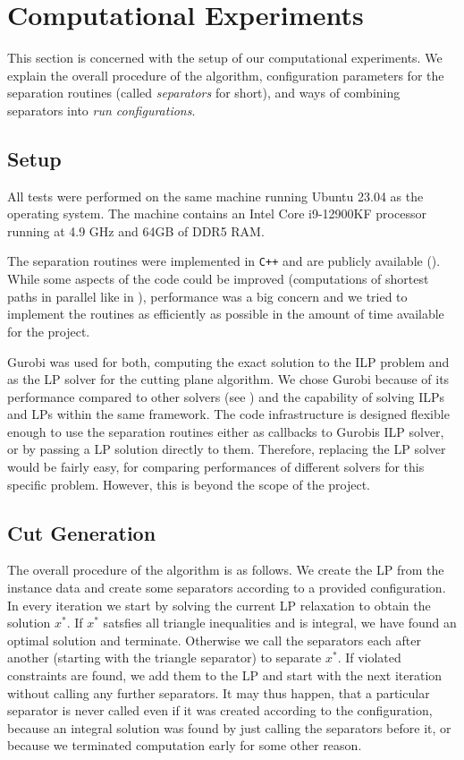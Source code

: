 \section{Computational Experiments}\label{sec:experiments}
This section is concerned with the setup of our computational experiments.
We explain the overall procedure of the algorithm, configuration parameters for the separation routines (called \textit{separators} for short), and ways of combining separators into \textit{run configurations}.

\subsection{Setup}\label{subsec:experiments_setup}
All tests were performed on the same machine running Ubuntu 23.04 as the operating system.
The machine contains an Intel Core i9-12900KF processor running at 4.9 GHz and 64GB of DDR5 RAM. 

The separation routines were implemented in \texttt{C++} and are publicly available (\cite{moellerCliqpart2023}).
While some aspects of the code could be improved (\eg computations of shortest paths in parallel like in \cite{sorensenSeparationHeuristic2Partition2020}),
performance was a big concern and we tried to implement the routines as efficiently as possible in the amount of time available for the project.

Gurobi \cite{gurobioptimizationllcGurobiOptimizerReference2023} was used for both, computing the exact solution to the ILP problem and as the LP solver for the cutting plane algorithm.
We chose Gurobi because of its performance compared to other solvers (see \cite{meindlAnalysisCommercialFree2012}) and the capability of solving ILPs and LPs within the same framework.
The code infrastructure is designed flexible enough to use the separation routines either as callbacks to Gurobis ILP solver, or by passing a LP solution directly to them.
Therefore, replacing the LP solver would be fairly easy, \eg for comparing performances of different solvers for this specific problem.
However, this is beyond the scope of the project.

\subsection{Cut Generation}\label{subsec:cut_generation}
The overall procedure of the algorithm is as follows.
We create the LP from the instance data and create some separators according to a provided configuration.
In every iteration we start by solving the current LP relaxation to obtain the solution $x^{*}$.
If $x^{*}$ satsfies all triangle inequalities and is integral, we have found an optimal solution and terminate.
Otherwise we call the separators each after another (starting with the triangle separator) to separate $x^{*}$.
If violated constraints are found, we add them to the LP and start with the next iteration without calling any further separators.
It may thus happen, that a particular separator is never called even if it was created according to the configuration,
\eg because an integral solution was found by just calling the separators before it, or because we terminated computation early for some other reason.

